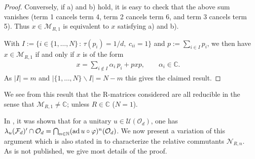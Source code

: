 \documentclass[12pt,a4paper]{amsart}
\numberwithin{equation}{section}
\theoremstyle{remark}
\DeclareMathOperator{\ad}{ad}
\newcommand{\Cl}{\mathbb{C}}
\newcommand{\Nl}{\mathbb{N}}
\newcommand{\la}{\lambda}
\newcommand{\CM}[0]{\mathcal{M}} \newcommand{\CN}[0]{\mathcal{N}}
\newcommand{\CO}[0]{\mathcal{O}} \newcommand{\CP}[0]{\mathcal{P}}
\newcommand{\CU}[0]{\mathcal{U}} \newcommand{\CV}[0]{\mathcal{V}}
\begin{document}
\begin{proof}
    Conversely, if a) and b) hold, it is easy to check that the above sum vanishes (term 1 cancels term 4, term 2 cancels term 6, and term 3 cancels term 5). Thus $x\in\CM_{R,1}$ is equivalent to $x$ satisfying a) and b).
    
    With $I:=\{i\in\{1,\ldots,N\}\,:\,\tau(p_i)=1/d,\;c_{ii}=1\}$ and $p:=\sum_{i\in I}p_i$, we then have $x\in\CM_{R,1}$ if and only if $x$ is of the form 
    \begin{align*}
        x=\sum_{i\not\in I} \alpha_i\,p_i + pxp,\qquad \alpha_i\in\Cl.
    \end{align*}
    As $|I|=m$ and $|\{1,\ldots,N\}\backslash I|=N-m$ this gives the claimed result.
\end{proof}

We see from this result that the R-matrices considered are all reducible in the sense that $\CM_{R,1}\neq\Cl$; unless $R\in\Cl$ ($N=1$). 

\medskip

In \cite[Prop.~2.3]{ContiRordamSzymanski:2010}, it was shown that for a unitary $u\in\CU(\CO_d)$, one has $\la_u(\CF_d)'\cap\CO_d=\bigcap_{n\in\Nl}(\ad u\circ\varphi)^n(\CO_d)$. We now present a variation of this argument which is also stated in \cite{Akemann:1997} to characterize the relative commutants $\CN_{R,n}$. As \cite{Akemann:1997} is not published, we give most details of the proof.
\end{document}
